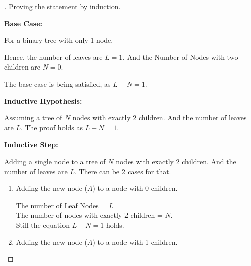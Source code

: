 \documentclass[a4paper, 12pt]{article}
\begin{document}
\begin{proof}[\color{red}{Solution}]
Proving the statement by induction.
\smallskip

\textbf{Base Case:}

\hspace{1em} For a binary tree with only 1 node.

\hspace{1em} Hence, the number of leaves are $L = 1$. And the Number of Nodes with two children are $N = 0$.

\hspace{1em} The base case is being satisfied, as $L - N = 1$.

\smallskip

\textbf{Inductive Hypothesis:}

\hspace{1em} Assuming a tree of $N$ nodes with exactly 2 children. And the number of leaves are $L$. The proof holds as $L - N = 1$.

\smallskip

\textbf{Inductive Step:}

\hspace{1em} Adding a single node to a tree of $N$ nodes with exactly 2 children. And the number of leaves are $L$. There can be 2 cases for that. 

\begin{enumerate}
    \item Adding the new node ($A$) to a node with 0 children. 
    \begin{center}
    \end{center} 
    
    The number of Leaf Nodes = $L$\\
    The number of nodes with exactly 2 children = $N$. \\
    Still the equation $L - N = 1$ holds.
    
    \item Adding the new node ($A$) to a node with 1 children. 
    \begin{center}
    \end{center} 
    

\end{enumerate}
\end{proof}
\end{document}
